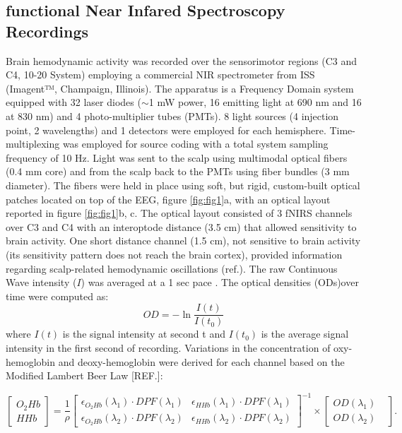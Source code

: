 \documentclass[12pt ]{iopart}
\begin{document}
\subsection{functional Near Infared Spectroscopy Recordings}
Brain hemodynamic activity was recorded over the sensorimotor regions (C3 and C4, 10-20 System) employing a commercial NIR spectrometer from ISS (Imagent™, Champaign, Illinois).
The apparatus is a Frequency Domain system equipped with 32 laser diodes ($\sim$1 mW  power, 16 emitting light at 690 nm and 16 at 830 nm) and 4 photo-multiplier tubes (PMTs). 
8 light sources (4 injection point, 2 wavelengths) and 1 detectors were employed for each hemisphere. Time-multiplexing was employed for source coding with a total system sampling frequency of 10 Hz.  Light was sent to the scalp using multimodal optical fibers (0.4 mm core) and from the scalp back to the PMTs using fiber bundles (3 mm diameter).  The fibers were held in place using soft, but rigid, custom-built optical patches located on top of the EEG, figure \ref{fig:fig1}a, with an optical layout reported in figure \ref{fig:fig1}b, c. The optical layout consisted of 3 fNIRS channels over C3 and C4 with an interoptode distance (3.5 cm) that allowed sensitivity to brain activity. One short distance channel (1.5 cm),  not sensitive to brain activity (its sensitivity pattern does not reach the brain cortex), provided information regarding scalp-related hemodynamic oscillations (ref.).  
The raw Continuous Wave intensity ($I$)  was averaged  at a 1 sec pace .
The optical densities (ODs)over time were computed as:
\begin{equation}
\label{eqn:erders}
OD=-\ln\frac{I(t)}{I(t_{0})}
\end{equation} 
where $I(t)$ is the signal intensity at second t and $I(t_{0})$ is the average signal intensity in the first second of recording.
Variations in the concentration of oxy-hemoglobin and deoxy-hemoglobin were derived for each channel  based on the Modified Lambert Beer Law [REF.]:

\begin{equation}
\begin{bmatrix}
O_2Hb\\
HHb
\end{bmatrix}
=
\frac{1}{\rho}\begin{bmatrix}
\epsilon_{O_2Hb}(\lambda_1)\cdot DPF(\lambda_1)&\epsilon_{HHb}(\lambda_1)\cdot DPF(\lambda_1)\\
\epsilon_{O_2Hb}(\lambda_2)\cdot DPF(\lambda_2)&\epsilon_{HHb}(\lambda_2)\cdot DPF(\lambda_2)
\end{bmatrix}^{-1}\times
\begin{bmatrix}
OD(\lambda_1)&\\
OD(\lambda_2)
\end{bmatrix}
.
\end{equation}
\end{document}
